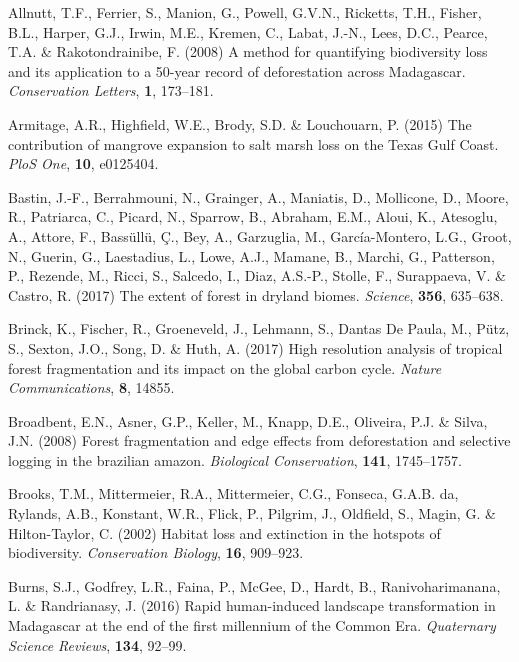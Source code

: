 \documentclass[]{article}
\theoremstyle{definition}
\theoremstyle{definition}
\theoremstyle{definition}
\theoremstyle{remark}
\begin{document}
\leavevmode\hypertarget{ref-Allnutt2008}{}%
Allnutt, T.F., Ferrier, S., Manion, G., Powell, G.V.N., Ricketts, T.H.,
Fisher, B.L., Harper, G.J., Irwin, M.E., Kremen, C., Labat, J.-N., Lees,
D.C., Pearce, T.A. \& Rakotondrainibe, F. (2008) A method for
quantifying biodiversity loss and its application to a 50-year record of
deforestation across Madagascar. \emph{Conservation Letters},
\textbf{1}, 173--181.

\leavevmode\hypertarget{ref-Armitage2015}{}%
Armitage, A.R., Highfield, W.E., Brody, S.D. \& Louchouarn, P. (2015)
The contribution of mangrove expansion to salt marsh loss on the Texas
Gulf Coast. \emph{PloS One}, \textbf{10}, e0125404.

\leavevmode\hypertarget{ref-Bastin2017}{}%
Bastin, J.-F., Berrahmouni, N., Grainger, A., Maniatis, D., Mollicone,
D., Moore, R., Patriarca, C., Picard, N., Sparrow, B., Abraham, E.M.,
Aloui, K., Atesoglu, A., Attore, F., Bassüllü, Ç., Bey, A., Garzuglia,
M., García-Montero, L.G., Groot, N., Guerin, G., Laestadius, L., Lowe,
A.J., Mamane, B., Marchi, G., Patterson, P., Rezende, M., Ricci, S.,
Salcedo, I., Diaz, A.S.-P., Stolle, F., Surappaeva, V. \& Castro, R.
(2017) The extent of forest in dryland biomes. \emph{Science},
\textbf{356}, 635--638.

\leavevmode\hypertarget{ref-Brinck2017}{}%
Brinck, K., Fischer, R., Groeneveld, J., Lehmann, S., Dantas De Paula,
M., Pütz, S., Sexton, J.O., Song, D. \& Huth, A. (2017) High resolution
analysis of tropical forest fragmentation and its impact on the global
carbon cycle. \emph{Nature Communications}, \textbf{8}, 14855.

\leavevmode\hypertarget{ref-Broadbent2008}{}%
Broadbent, E.N., Asner, G.P., Keller, M., Knapp, D.E., Oliveira, P.J. \&
Silva, J.N. (2008) Forest fragmentation and edge effects from
deforestation and selective logging in the brazilian amazon.
\emph{Biological Conservation}, \textbf{141}, 1745--1757.

\leavevmode\hypertarget{ref-Brooks2002}{}%
Brooks, T.M., Mittermeier, R.A., Mittermeier, C.G., Fonseca, G.A.B. da,
Rylands, A.B., Konstant, W.R., Flick, P., Pilgrim, J., Oldfield, S.,
Magin, G. \& Hilton-Taylor, C. (2002) Habitat loss and extinction in the
hotspots of biodiversity. \emph{Conservation Biology}, \textbf{16},
909--923.

\leavevmode\hypertarget{ref-Burns2016}{}%
Burns, S.J., Godfrey, L.R., Faina, P., McGee, D., Hardt, B.,
Ranivoharimanana, L. \& Randrianasy, J. (2016) Rapid human-induced
landscape transformation in Madagascar at the end of the first
millennium of the Common Era. \emph{Quaternary Science Reviews},
\textbf{134}, 92--99.
\end{document}
